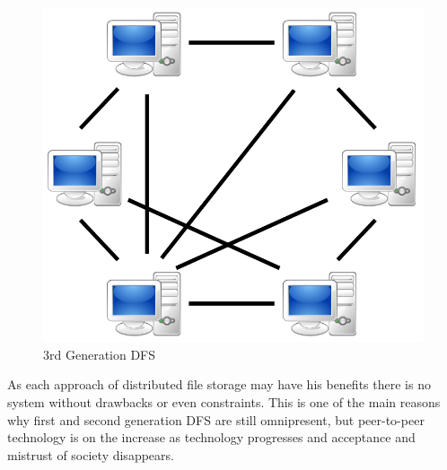 	\begin{figure}[H]
		\begin{center}
		\includegraphics[scale=0.25]{Talk5/3rd_gen_dfs.PNG}
		\end{center}
		\caption{3rd Generation DFS \cite{wikimedia:p2p}}
		\label{3rd_gen_dfs}
	\end{figure}
As each approach of distributed file storage may have his benefits there is no system without drawbacks or even constraints. This is one of the main reasons why first and second generation DFS are still omnipresent, but peer-to-peer technology is on the increase as technology progresses and acceptance and mistrust of society disappears.

